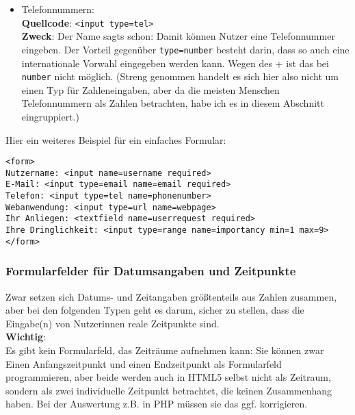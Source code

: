 \begin{itemize}
	\item Telefonnummern:\\

	\textbf{Quellcode}: \verb|<input type=tel>|\\

	\textbf{Zweck}: Der Name sagts schon: Damit können Nutzer eine Telefonnummer eingeben. Der Vorteil gegenüber \verb|type=number| besteht darin, dass so auch eine internationale Vorwahl eingegeben werden kann. Wegen des + ist das bei \verb|number| nicht möglich. (Streng genommen handelt es sich hier also nicht um einen Typ für Zahleneingaben, aber da die meisten Menschen Telefonnummern als Zahlen betrachten, habe ich es in diesem Abschnitt eingruppiert.)\\
\end{itemize}

Hier ein weiteres Beispiel für ein einfaches Formular:

\begin{verbatim}
<form>
Nutzername: <input name=username required>
E-Mail: <input type=email name=email required>
Telefon: <input type=tel name=phonenumber>
Webanwendung: <input type=url name=webpage>
Ihr Anliegen: <textfield name=userrequest required>
Ihre Dringlichkeit: <input type=range name=importancy min=1 max=9>
</form>
\end{verbatim}

\subsubsection{Formularfelder für Datumsangaben und Zeitpunkte}

Zwar setzen sich Datums- und Zeitangaben größtenteils aus Zahlen zusammen, aber bei den folgenden Typen geht es darum, sicher zu stellen, dass die Eingabe(n) von Nutzerinnen reale Zeitpunkte sind.\\

\textbf{Wichtig}:\\

Es gibt kein Formularfeld, das Zeiträume aufnehmen kann: Sie können zwar Einen Anfangszeitpunkt und einen Endzeitpunkt als Formularfeld programmieren, aber beide werden auch in HTML5 selbst nicht als Zeitraum, sondern als zwei individuelle Zeitpunkt betrachtet, die keinen Zusammenhang haben. Bei der Auswertung z.B. in PHP müssen sie das ggf. \glqq{}korrigieren\grqq{}.

